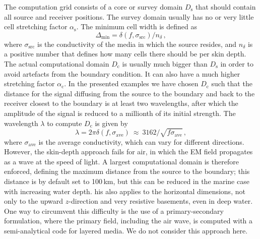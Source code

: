 \documentclass[extra, camera,%
    onecolumn,   %
    referee,     %
]{gji}
\newcommand{\mr}[1]{\mathrm{#1}}
\begin{document}
The computation grid consists of a core or survey domain $D_\mr{s}$ that should
contain all source and receiver positions. The survey domain usually has no or
very little cell stretching factor $\alpha_\mr{s}$. The minimum cell width is
defined as
%
\begin{equation}
  \Delta_\mr{min}=\delta(f, \sigma_\mr{src})/n_\delta \, ,
  \label{eq:minwidth}
\end{equation}
%
where $\sigma_\mr{src}$ is the conductivity of the media in which the source
resides, and $n_\delta$ is a positive number that defines how many cells there
should be per skin depth. The actual computational domain $D_\mr{c}$ is usually
much bigger than $D_\mr{s}$ in order to avoid artefacts from the
 boundary condition. It can also
have a much higher stretching factor $\alpha_\mr{c}$. In the presented examples
we have chosen $D_\mr{c}$ such that the distance for the signal diffusing from
the source to the boundary and back to the receiver closest to the boundary is
at least two wavelengths, after which the amplitude of the signal is reduced to
a millionth of its initial strength. The wavelength $\lambda$ to compute
$D_\mr{c}$ is given by
%
\begin{equation}
  \lambda = 2\pi\delta(f, \sigma_\mr{ave})
  \ \approx \ 3162/\sqrt{f\sigma_\mr{ave}}\, ,
 \label{eq:lambda}
\end{equation}
%
where $\sigma_\mr{ave}$ is the average conductivity, which can vary for
different directions. However, the skin-depth approach fails for air, in which
the EM field propagates as a wave at the speed of light. A largest
computational domain is therefore enforced, defining the maximum distance from
the source to the boundary; this distance is by default set to 100\,km, but
this can be reduced in the marine case with increasing water depth.
his also
applies to the horizontal dimensions, not only to the upward
$z$-direction\added{,} and  very
resistive basements, even in deep water. One way to circumvent this difficulty
is the use of a primary-secondary formulation, where the primary field,
including the air wave, is computed with a semi-analytical code for layered
media. We do not consider this approach here. 
\end{document}
